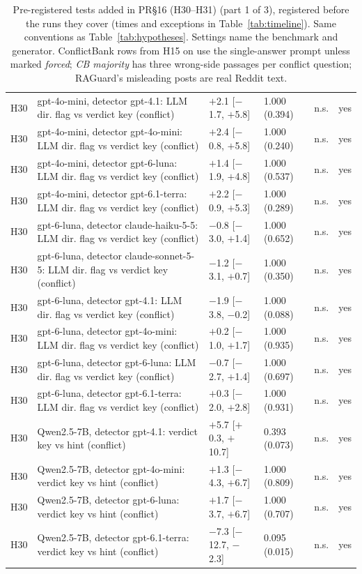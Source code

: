 \begin{table}[p]
{\begin{tabular}{lp{6.6cm}llll}
H30 & gpt-4o-mini, detector gpt-4.1: LLM dir. flag vs verdict key (conflict) & $+$2.1 [$-$1.7, $+$5.8] & 1.000 (0.394) & n.s. & yes \\
H30 & gpt-4o-mini, detector gpt-4o-mini: LLM dir. flag vs verdict key (conflict) & $+$2.4 [$-$0.8, $+$5.8] & 1.000 (0.240) & n.s. & yes \\
H30 & gpt-4o-mini, detector gpt-6-luna: LLM dir. flag vs verdict key (conflict) & $+$1.4 [$-$1.9, $+$4.8] & 1.000 (0.537) & n.s. & yes \\
H30 & gpt-4o-mini, detector gpt-6.1-terra: LLM dir. flag vs verdict key (conflict) & $+$2.2 [$-$0.9, $+$5.3] & 1.000 (0.289) & n.s. & yes \\
H30 & gpt-6-luna, detector claude-haiku-5-5: LLM dir. flag vs verdict key (conflict) & $-$0.8 [$-$3.0, $+$1.4] & 1.000 (0.652) & n.s. & yes \\
H30 & gpt-6-luna, detector claude-sonnet-5-5: LLM dir. flag vs verdict key (conflict) & $-$1.2 [$-$3.1, $+$0.7] & 1.000 (0.350) & n.s. & yes \\
H30 & gpt-6-luna, detector gpt-4.1: LLM dir. flag vs verdict key (conflict) & $-$1.9 [$-$3.8, $-$0.2] & 1.000 (0.088) & n.s. & yes \\
H30 & gpt-6-luna, detector gpt-4o-mini: LLM dir. flag vs verdict key (conflict) & $+$0.2 [$-$1.0, $+$1.7] & 1.000 (0.935) & n.s. & yes \\
H30 & gpt-6-luna, detector gpt-6-luna: LLM dir. flag vs verdict key (conflict) & $-$0.7 [$-$2.7, $+$1.4] & 1.000 (0.697) & n.s. & yes \\
H30 & gpt-6-luna, detector gpt-6.1-terra: LLM dir. flag vs verdict key (conflict) & $+$0.3 [$-$2.0, $+$2.8] & 1.000 (0.931) & n.s. & yes \\
H30 & Qwen2.5-7B, detector gpt-4.1: verdict key vs hint (conflict) & $+$5.7 [$+$0.3, $+$10.7] & 0.393 (0.073) & n.s. & yes \\
H30 & Qwen2.5-7B, detector gpt-4o-mini: verdict key vs hint (conflict) & $+$1.3 [$-$4.3, $+$6.7] & 1.000 (0.809) & n.s. & yes \\
H30 & Qwen2.5-7B, detector gpt-6-luna: verdict key vs hint (conflict) & $+$1.7 [$-$3.7, $+$6.7] & 1.000 (0.707) & n.s. & yes \\
H30 & Qwen2.5-7B, detector gpt-6.1-terra: verdict key vs hint (conflict) & $-$7.3 [$-$12.7, $-$2.3] & 0.095 (0.015) & n.s. & yes \\
\bottomrule
\end{tabular}}
\caption{Pre-registered tests added in PR\S16 (H30--H31) (part 1 of 3), registered before the runs they cover (times and exceptions in
Table~\ref{tab:timeline}). Same conventions as
Table~\ref{tab:hypotheses}. Settings name the benchmark and generator. ConflictBank rows from H15 on use the
single-answer prompt unless marked \emph{forced}; \emph{CB majority} has three wrong-side passages per conflict
question; RAGuard's misleading posts are real Reddit text.}
\label{tab:hypotheses16}
\end{table}

